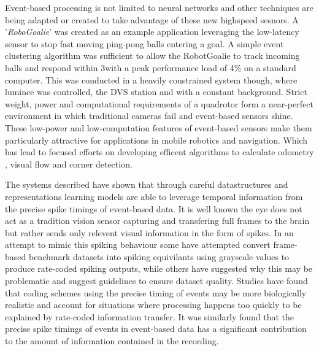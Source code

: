 Event-based processing is not limited to neural networks and other techniques are being adapted or created to take advantage of these new highspeed sesnors\cite{ni2015visual}.
A '\textit{RoboGoalie}' was created as an example application leveraging the low-latency sensor to stop fast moving ping-pong balls entering a goal\cite{delbruck2007fast}. 
A simple event clustering algorithm was sufficient to allow the RobotGoalie to track incoming balls and respond within 3\ms with a peak performance load of 4\% on a standard computer. 
This was conducted in a heavily constrained system though, where lumince was controlled, the DVS station and with a constant background. 
Strict weight, power and computational requirements of a quadrotor form a near-perfect environment in which traditional cameras fail and event-based sensors shine\cite{mueggler2014event}.
These low-power and low-computation features of event-based sensors make them particularly attractive for applications in mobile robotics and navigation\cite{weikersdorfer2013simultaneous, milford2015place}.
Which has lead to focused efforts on developing efficent algorithms to calculate odometry \cite{censi2014low}, visual flow \cite{benosman2014event} and corner detection\cite{clady2015asynchronous}.


The systems described have shown that through careful datastructures and representations learning models are able to leverage temporal information from the precise spike timings of event-based data. 
It is well known the eye does not act as a tradition vision sensor capturing and transfering full frames to the brain but rather sends only relevent visual information in the form of spikes\cite{delbruck2010activity}.
In an attempt to mimic this spiking behaviour some have attempted convert frame-based benchmark datasets into spiking equivilants using grayscale values to produce rate-coded spiking outputs, while others have suggested why this may be problematic \cite{akolkar2015can} and suggest guidelines to ensure dataset quality\cite{tan2015benchmarking}.
Studies have found that coding schemes using the precise timing of events may be more biologically realistic and account for situations where processing happens too quickly to be explained by rate-coded information transfer\cite{thorpe2001spike}. 
It was similarly found that the precise spike timings of events in event-based data has a significant contribution to the amount of information contained in the recording\cite{akolkar2015can}.


